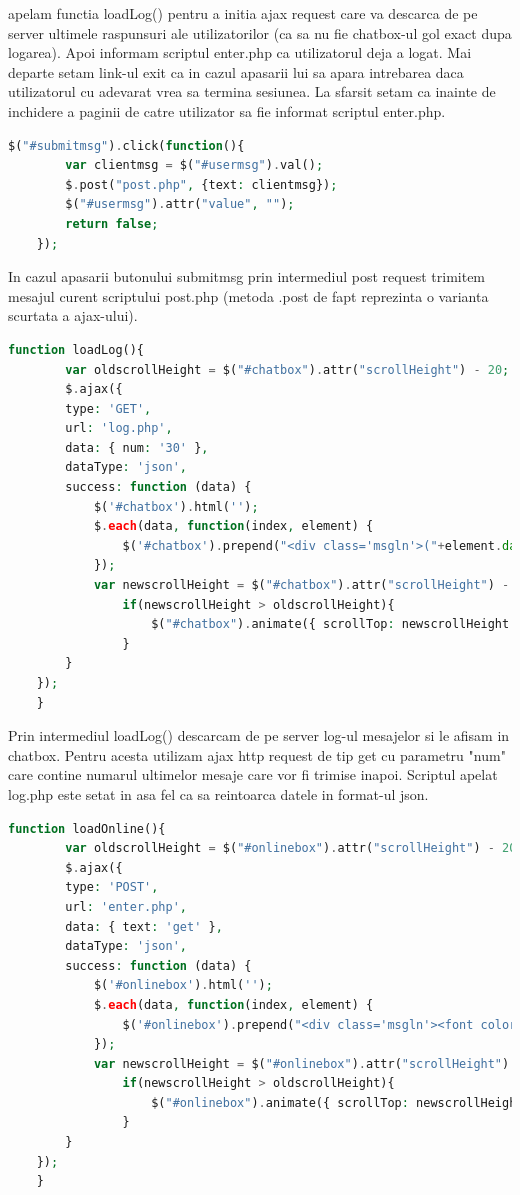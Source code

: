 \documentclass[12pt]{article}
\begin{document}
apelam functia loadLog() pentru a initia ajax request care va descarca de pe server ultimele raspunsuri ale utilizatorilor (ca sa nu fie chatbox-ul gol exact dupa logarea). Apoi informam scriptul enter.php ca utilizatorul deja a logat. Mai departe setam link-ul exit ca in cazul apasarii lui sa apara intrebarea daca utilizatorul cu adevarat vrea sa termina sesiunea. La sfarsit setam ca inainte de inchidere a paginii de catre utilizator sa fie informat scriptul enter.php.
\newpage
\begin{lstlisting}[language=php, caption={Fisierul index.php. Trimiterea mesajelor scrise de utilizator}, label=list2]
$("#submitmsg").click(function(){	
		var clientmsg = $("#usermsg").val();
		$.post("post.php", {text: clientmsg});				
		$("#usermsg").attr("value", "");
		return false;
	});
\end{lstlisting}
In cazul apasarii butonului submitmsg prin intermediul post request trimitem mesajul curent scriptului post.php (metoda .post de fapt reprezinta o varianta scurtata a ajax-ului).
\begin{lstlisting}[language=php, caption={Fisierul index.php. metoda loadLog()}, label=list2]
function loadLog(){      
        var oldscrollHeight = $("#chatbox").attr("scrollHeight") - 20;
        $.ajax({ 
        type: 'GET', 
        url: 'log.php', 
        data: { num: '30' }, 
        dataType: 'json',
        success: function (data) { 
            $('#chatbox').html('');
            $.each(data, function(index, element) {
                $('#chatbox').prepend("<div class='msgln'>("+element.datetime+") <b>"+element.nick+"</b>: "+element.msg+"<br></div>");
            });
            var newscrollHeight = $("#chatbox").attr("scrollHeight") - 20;
                if(newscrollHeight > oldscrollHeight){
                    $("#chatbox").animate({ scrollTop: newscrollHeight }, 'normal');
                }               
        }
    });
    }
\end{lstlisting}
Prin intermediul loadLog() descarcam de pe server log-ul mesajelor si le afisam in chatbox. Pentru acesta utilizam ajax http request de tip get cu parametru "num" care contine numarul ultimelor mesaje care vor fi trimise inapoi. Scriptul apelat log.php este setat in asa fel ca sa reintoarca datele in format-ul json. 
\newpage
\begin{lstlisting}[language=php, caption={Fisierul index.php. metoda loadOnline()}, label=list2]
function loadOnline(){      
        var oldscrollHeight = $("#onlinebox").attr("scrollHeight") - 20;
        $.ajax({ 
        type: 'POST', 
        url: 'enter.php', 
        data: { text: 'get' }, 
        dataType: 'json',
        success: function (data) { 
            $('#onlinebox').html('');
            $.each(data, function(index, element) {
                $('#onlinebox').prepend("<div class='msgln'><font color='red'><b>"+element.nick+"</b></font><br></div>");
            });
            var newscrollHeight = $("#onlinebox").attr("scrollHeight") - 20;
                if(newscrollHeight > oldscrollHeight){
                    $("#onlinebox").animate({ scrollTop: newscrollHeight }, 'normal');
                }               
        }
    });
    }\end{lstlisting}
\end{document}
